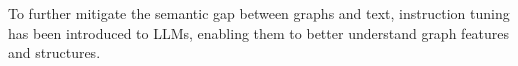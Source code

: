To further mitigate the semantic gap between graphs and text, instruction tuning \cite{instructglm, tang2024graphgpt, zhang2023graph} has been introduced to LLMs, enabling them to better understand graph features and structures. 




